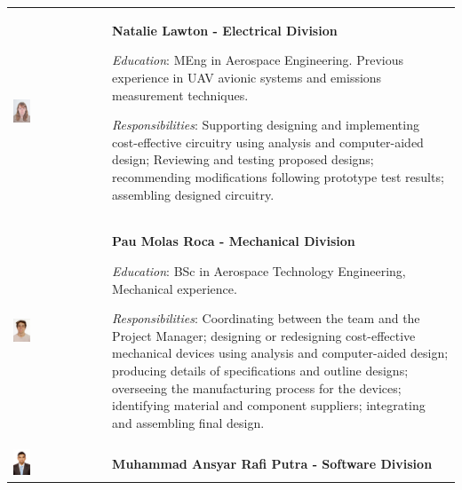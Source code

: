 \begin{longtable}[]{m{} m{}}
\includegraphics[width=0.2\textwidth]{1-introduction/img/natalie-lawton.jpg} & \textbf{Natalie Lawton - Electrical Division}

\smallskip
\textit{Education}: MEng in Aerospace Engineering. Previous experience in UAV avionic systems and emissions measurement techniques.

\smallskip
\textit{Responsibilities}: Supporting designing and implementing cost-effective circuitry using analysis and computer-aided design; Reviewing and testing proposed designs; recommending modifications following prototype test results; assembling designed circuitry. 
\bigskip
\\

\includegraphics[width=0.2\textwidth]{1-introduction/img/pau-molas-roca.jpg} & \textbf{Pau Molas Roca - Mechanical Division}

\smallskip
\textit{Education}: BSc in Aerospace Technology Engineering, Mechanical experience.

\smallskip
\textit{Responsibilities}: Coordinating between the team and the Project Manager; designing or redesigning cost-effective mechanical devices using analysis and computer-aided design; producing details of specifications and outline designs; overseeing the manufacturing process for the devices; identifying material and component suppliers; integrating and assembling final design.   \bigskip
\\

\includegraphics[width=0.2\textwidth]{1-introduction/img/muhammad-ansyar-rafi-putra.jpg} & \textbf{Muhammad Ansyar Rafi Putra - Software Division}


\end{longtable}
